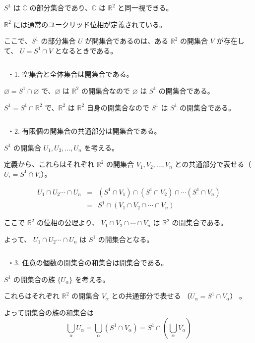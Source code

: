 \documentclass[uplatex,a4j,12pt,dvipdfmx]{jsarticle}
\begin{document}
${}$

$S^{1}$ は $\mathbb{C}$ の部分集合であり、$\mathbb{C}$ は $\mathbb{R}^{2}$ と同一視できる。

$\mathbb{R}^{2}$ には通常のユークリッド位相が定義されている。

ここで、$S^{1}$ の部分集合 $U$ が開集合であるのは、ある $\mathbb{R}^{2}$ の開集合 $V$ が存在して、 $U=S^{1} \cap V$ となるときである。

${}$

\ ・1. 空集合と全体集合は開集合である。

$\varnothing = S^{1} \cap \varnothing$ で、$\varnothing$ は $\mathbb{R}^{2}$ の開集合なので
$\varnothing$ は $S^{1}$ の開集合である。

$S^{1} = S^{1} \cap \mathbb{R}^{2}$ で、$\mathbb{R}^{2}$ は $\mathbb{R}^{2}$ 自身の開集合なので
$S^{1}$ は $S^{1}$ の開集合である。

${}$

\ ・2. 有限個の開集合の共通部分は開集合である。

$S^{1}$ の開集合
$U_{1}, U_{2} , \dots , U_{n}$
を考える。

定義から、これらはそれぞれ $\mathbb{R}^{2}$ の開集合
$V_{1}, V_{2} , \dots , V_{n}$
との共通部分で表せる（$U_{i} = S^{1} \cap V_{i}$）。

\[
	\begin{array}{rcl}
		U_{1} \cap U_{2} \cdots \cap U_{n}
		 & = &
		(S^{1} \cap V_{1}) \cap (S^{1} \cap V_{2}) \cap \cdots (S^{1} \cap V_{n})
		\\
		 & = &
		S^{1} \cap ( V_{1} \cap  V_{2} \cap \cdots \cap V_{n})
	\end{array}
\]

ここで $\mathbb{R}^{2}$ の位相の公理より、
$V_{1} \cap  V_{2} \cap \cdots \cap V_{n}$
は $\mathbb{R}^{2}$ の開集合である。

よって、
$U_{1} \cap U_{2} \cdots \cap U_{n}$
は $S^{1}$ の開集合となる。


${}$

\ ・3. 任意の個数の開集合の和集合は開集合である。

$S^{1}$ の開集合の族 $\{ U_{\alpha} \}$ を考える。

これらはそれぞれ $\mathbb{R}^{2}$ の開集合 $V_{\alpha}$ との共通部分で表せる
（$U_{\alpha}=S^{1} \cap V_{\alpha}$）
。

よって開集合の族の和集合は
\[
	\bigcup_{\alpha} U_{\alpha}
	=
	\bigcup_{\alpha} (S^{1} \cap V_{\alpha})
	=
	S^{1} \cap \left( \bigcup_{\alpha} V_{\alpha} \right)
\]
\end{document}
